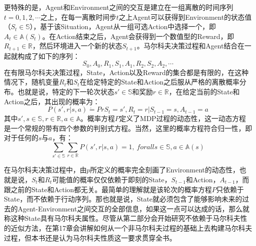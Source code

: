 \documentclass{ctexart}
\begin{document}
            更特殊的是，Agent和Environment之间的交互是建立在一组离散的时间序列$t=0,1,2,\cdots$之上，在每一离散时间步$t$之上Agent可以获得到Environment的状态值（$S_t \in \mathbb{S}$），基于该Situation，Agent从一组可选Action中选择一个，即$A_t \in \mathbb{A}(S_t)$。在Action结束之后，Agent会获得到一个数值型的Reward，即$R_{t+1} \in \mathbb{R}$，然后环境进入一个新的状态$S_{t+1}$。马尔科夫决策过程和Agent结合在一起就构成了如下的序列：
            \begin{equation}
                S_0,A_0,R_1,S_1,A_1,R_2,S_2,A_2,\cdots
                \label{e3.1}
            \end{equation}
            在有限马尔科夫决策过程，State，Action以及Reward的集合都是有限的，在这种情况下，随机变量$R_t$和$S_t$在给定特定的State和Action之后服从严格的离散概率分布。也就是说，特定的下一轮次状态$s'\in \mathbb{S}$和奖励$r\in \mathbb{R}$，在给定当前的State和Action之后，其出现的概率为：
            \begin{equation}
                P(s',r|s,a) \dot{=} Pr{S_t=s',R_t=r | S_{t-1}=s,A_{t-1}=a}
                \label{e3.2}
            \end{equation}
            其中$s',s\in \mathbb{S},r\in \mathbb{R},a\in \mathbb{A}$。概率方程$P$定义了MDP过程的动态性，这一动态方程是一个常规的带有四个参数的判别式方程。当然，这里的概率方程符合归一性，即对于任何的$s$与$a$，有：
            \begin{equation}
                \sum_{s'\in \mathbb{S}}\sum_{r\in \mathbb{R}} P(s',r|s,a) = 1,\ for all s\in \mathbb{S},a\in \mathbb{A}(s)
                \label{e3.3}
            \end{equation}

            在马尔科夫决策过程中，由$p$所定义的概率完全刻画了Environment的动态性，也就是说，$S_t$和$R_t$可能值的概率仅仅依赖于即刻的State，$S_{t-1}$和Action，$A_{t-1}$，而跟之前的State和Action都无关。最简单的理解就是该轮次的概率方程$P$只依赖于State，而不依赖于行动序列。那也就是说，State就必须包含了能够影响未来的过去的Agent-Environment之间交互的全部信息，如果这一点可以达成的话，那么就称这种State具有马尔科夫属性。尽管从第二部分会开始研究不依赖于马尔科夫性的近似方法，在第17章会讲解如何从一个非马尔科夫过程的基础上去构建马尔科夫过程，但本书还是认为马尔科夫性质这一要求贯穿全书。
\end{document}
